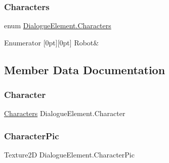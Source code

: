 \subsubsection{\texorpdfstring{Characters}{Characters}}
{\footnotesize\ttfamily enum \mbox{\hyperlink{class_dialogue_element_ae49b75aacbe9e237b4801a4153dd1bfa}{Dialogue\+Element.\+Characters}}\hspace{0.3cm}{\ttfamily [strong]}}

\begin{DoxyEnumFields}{Enumerator}
[0pt][0pt]{}\mbox{\label{class_dialogue_element_ae49b75aacbe9e237b4801a4153dd1bfaa5d1eca158c00250d9c4c32d947b7c433}} 
Robot&\\
\hline

\end{DoxyEnumFields}


\subsection{Member Data Documentation}
\mbox{\label{class_dialogue_element_ab41891d5d0d2f140ef8cb70cd2471e9c}} 
\subsubsection{\texorpdfstring{Character}{Character}}
{\footnotesize\ttfamily \mbox{\hyperlink{class_dialogue_element_ae49b75aacbe9e237b4801a4153dd1bfa}{Characters}} Dialogue\+Element.\+Character}

\mbox{\label{class_dialogue_element_a65e82dcc1e979f6890fd1f0c08cd43a6}} 
\subsubsection{\texorpdfstring{Character\+Pic}{CharacterPic}}
{\footnotesize\ttfamily Texture2D Dialogue\+Element.\+Character\+Pic}

